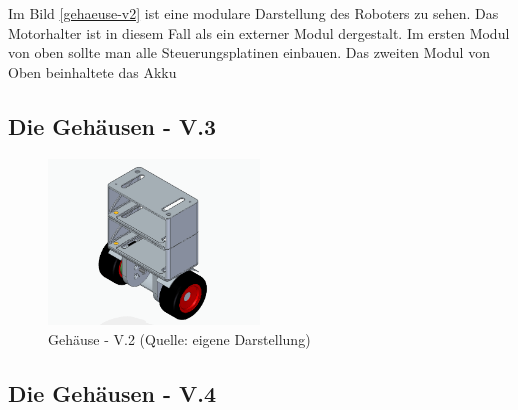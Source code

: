 Im Bild \ref{gehaeuse-v2} ist eine modulare Darstellung des Roboters zu sehen. Das Motorhalter ist in diesem Fall als ein externer Modul dergestalt. Im ersten Modul von oben sollte man alle Steuerungsplatinen  einbauen. Das zweiten Modul von Oben beinhaltete das Akku


\renewcommand{\autoren}{Valentyn Chepil}
\newpage

\subsection{Die Gehäusen - V.3}


\begin{figure}[!h]  %
	\centering\includegraphics[width=0.5\textwidth]{images/gehaeuse-v3.png}
	\caption{Gehäuse - V.2 \newline (Quelle: eigene Darstellung)}
	\label{gehaeuse-v3} %
\end{figure}

\subsection{Die Gehäusen - V.4}

